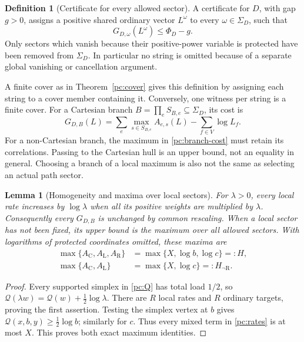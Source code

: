 \documentclass[11pt]{article}
\numberwithin{equation}{section}
\newtheorem{lemma}[theorem]{Lemma}
\theoremstyle{definition}\newtheorem{definition}[theorem]{Definition}
\theoremstyle{remark}\newtheorem{remark}[theorem]{Remark}
\newcommand{\C}{\mathrm C}
\newcommand{\Lft}{\mathrm L}
\newcommand{\Rgt}{\mathrm R}
\newcommand{\calQ}{\mathcal Q}
\begin{document}
\begin{definition}[Certificate for every allowed sector]\label{pc:certificate}
A certificate for \(D\), with gap \(g>0\), assigns a
positive shared ordinary vector \(L^\omega\) to every
\(\omega\in\Sigma_D\), such that
\[
                     G_{D,\omega}(L^\omega)\le\Phi_D-g.
\]
Only sectors which vanish because their positive-power variable is protected have been removed from
\(\Sigma_D\). In particular no string is omitted because of a
separate global vanishing or cancellation argument.
\end{definition}

A finite cover as in Theorem~\ref{pc:cover} gives this definition by
assigning each string to a cover member containing it. Conversely,
one witness per string is a finite cover. For a Cartesian branch
\(B=\prod_e S_{B,e}\subseteq\Sigma_D\), its cost is
\[
 G_{D,B}(L)=\sum_e\max_{s\in S_{B,e}}A_{e,s}(L)
                                  -\sum_{f\in V}\log L_f.
\]
For a non-Cartesian branch, the maximum in \eqref{pc:branch-cost}
must retain its correlations. Passing to the Cartesian hull is an
upper bound, not an equality in general. Choosing a branch of a
local maximum is also not the same as selecting an actual path sector.

\begin{lemma}[Homogeneity and maxima over local sectors]\label{pc:homogeneity}
For \(\lambda>0\), every local rate increases by \(\log\lambda\)
when all its positive weights are multiplied by \(\lambda\).
Consequently every \(G_{D,B}\) is unchanged by common rescaling.
When a local sector has not been fixed, its upper bound is the
maximum over all allowed sectors. With logarithms of protected
coordinates omitted, these maxima are
\begin{equation}\label{pc:spectators}
\begin{aligned}
 \max\{A_\C,A_\Lft,A_\Rgt\}&=\max\{X,\log b,\log c\}=:H,\\
 \max\{A_\C,A_\Lft\}&=\max\{X,\log c\}=:H_{\neg\Rgt}.
\end{aligned}
\end{equation}
\end{lemma}
\begin{proof}
Every supported simplex in \eqref{pc:Q} has total load \(1/2\),
so \(\calQ(\lambda w)=\calQ(w)+\frac12\log\lambda\).
There are \(R\) local rates and \(R\) ordinary targets, proving
the first assertion. Testing the simplex vertex at \(b\) gives
\(\calQ(x,b,y)\ge\frac12\log b\); similarly for \(c\).
Thus every mixed term in \eqref{pc:rates} is at most \(X\).
This proves both exact maximum identities.
\end{proof}
\end{document}
